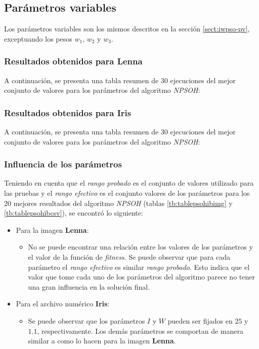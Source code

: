 \subsection{Parámetros variables}\label{sect:inpso-pv}

    Los parámetros variables son los mismos descritos en la sección \ref{sect:iwpso-pv},
exceptuando los pesos $w_1$, $w_2$ y $w_3$.

\subsubsection{Resultados obtenidos para \textbf{Lenna}}

    A continuación, se presenta una tabla resumen de 30 ejecuciones del mejor
conjunto de valores para los parámetros del algoritmo \emph{NPSOH}:



\subsubsection{Resultados obtenidos para \textbf{Iris}}

    A continuación, se presenta una tabla resumen de 30 ejecuciones del mejor
conjunto de valores para los parámetros del algoritmo \emph{NPSOH}:



\subsubsection{Influencia de los parámetros}

Teniendo en cuenta que el \emph{rango probado} es el conjunto de valores utilizado
para las pruebas y el \emph{rango efectivo} es el conjunto valores de los parámetros
para los 20 mejores resultados del algoritmo \emph{NPSOH} (tablas \ref{tb:tablepsohibimg}
y \ref{tb:tablepsohibcsv}), se encontró lo siguiente:

\begin{itemize}
	\item Para la imagen \textbf{Lenna}:
	\begin{itemize}
		\item No se puede encontrar una relación entre los valores de los
			parámetros y el valor de la función de \emph{fitness}. Se
			puede observar que para cada parámetro el \emph{rango efectivo}
			es similar \emph{rango probado}. Esto indica que el valor que tome cada
			uno de los parámetros del algoritmo parece no tener una gran influencia en la
			solución final.
	\end{itemize}
	\item Para el archivo numérico \textbf{Iris}:
	\begin{itemize}
		\item Se puede observar que los parámetros $I$ y $W$ pueden ser fijados
			en $25$ y $1.1$, respectivamente. Los demás parámetros se comportan de manera similar 
			a como lo hacen para la imagen {\bf Lenna}.
	\end{itemize}
\end{itemize}

